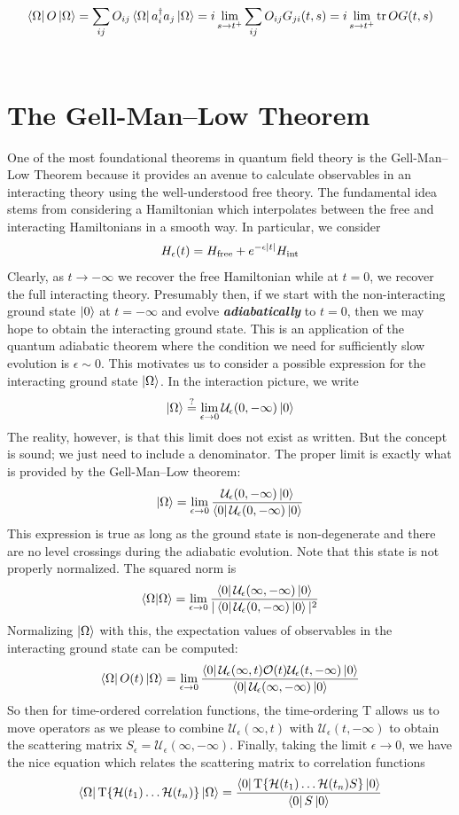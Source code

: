 \documentclass[onecolumn]{gwclass}
\renewcommand{\t}[1]{\text{#1}}
\def \timeorder{\t{T}}
\begin{document}
$$ \bra{\Omega}O\ket{\Omega} = \sum_{ij}O_{ij}\bra{\Omega}a_i^\dagger a_j\ket{\Omega} = i\lim_{s\to t^+} \sum_{ij}O_{ij}G_{ji}(t,s) = i\lim_{s\to t^+} \tr OG(t,s) $$
\\


\newpage 

\section{The Gell-Man--Low Theorem}
One of the most foundational theorems in quantum field theory is the Gell-Man--Low Theorem because it provides an avenue to calculate observables in an interacting theory using the well-understood free theory. The fundamental idea stems from considering a Hamiltonian which interpolates between the free and interacting Hamiltonians in a smooth way. In particular, we consider 
$$H_\epsilon(t) = H_\t{free} + e^{-\epsilon\abs{t}}H_\t{int}$$
Clearly, as $t\to -\infty$ we recover the free Hamiltonian while at $t=0$, we recover the full interacting theory. Presumably then, if we start with the non-interacting ground state $\ket{0}$ at $t=-\infty$ and evolve \textbf{\emph{adiabatically}} to $t=0$, then we may hope to obtain the interacting ground state. This is an application of the quantum adiabatic theorem where the condition we need for sufficiently slow evolution is $\epsilon\sim 0$. This motivates us to consider a possible expression for the interacting ground state $\ket{\Omega}$. In the interaction picture, we write
$$\ket{\Omega}\stackrel{?}{=} \lim_{\epsilon\to 0}\mathcal{U}_\epsilon(0,-\infty)\ket{0}$$ 
The reality, however, is that this limit does not exist as written. But the concept is sound; we just need to include a denominator. The proper limit is exactly what is provided by the Gell-Man--Low theorem:
$$ \ket{\Omega} = \lim_{\epsilon\to 0}\frac{\mathcal{U}_\epsilon(0,-\infty)\ket{0}}{\bra{0}\mathcal{U}_\epsilon(0,-\infty)\ket{0}} $$
This expression is true as long as the ground state is non-degenerate and there are no level crossings during the adiabatic evolution. Note that this state is not properly normalized. The squared norm is 
$$ \bra{\Omega}\ket{\Omega} = \lim_{\epsilon\to 0} \frac{\bra{0}\mathcal{U}_\epsilon(\infty,-\infty)\ket{0}}{|\bra{0}\mathcal{U}_\epsilon(0,-\infty)\ket{0}|^2} $$
Normalizing $\ket{\Omega}$ with this, the expectation values of observables in the interacting ground state can be computed:
$$ \bra{\Omega}O(t)\ket{\Omega} = \lim_{\epsilon\to 0}\frac{\bra{0}\mathcal{U}_\epsilon(\infty, t)\mathcal{O}(t)\mathcal{U}_\epsilon(t,-\infty) \ket{0}}{\bra{0}\mathcal{U}_\epsilon(\infty,-\infty)\ket{0}} $$
So then for time-ordered correlation functions, the time-ordering $\timeorder$ allows us to move operators as we please to combine $\mathcal{U}_\epsilon(\infty,t)$ with $\mathcal{U}_\epsilon(t,-\infty)$ to obtain the scattering matrix $S_\epsilon=\mathcal{U}_\epsilon(\infty,-\infty)$. Finally, taking the limit $\epsilon\to 0$, we have the nice equation which relates the scattering matrix to correlation functions
$$ \bra{\Omega}\timeorder\{ \mathcal{H}(t_1)\dots\mathcal{H}(t_n) \}\ket{\Omega} =  \frac{\bra{0}\timeorder\{\mathcal{H}(t_1)\dots\mathcal{H}(t_n)S\} \ket{0}}{\bra{0}S\ket{0}} $$
\end{document}
